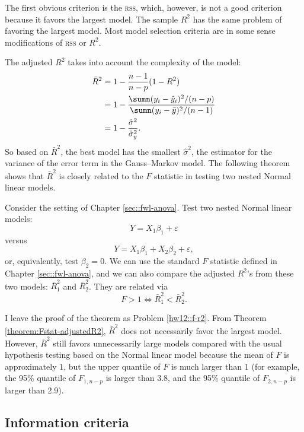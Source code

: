 The first obvious criterion is the \textsc{rss}, which, however, is not a good criterion because it favors the largest model. 
The sample $R^{2}$ has the same problem of favoring the largest model.
Most model selection criteria are in some sense modifications of \textsc{rss} or $R^2$.

 
The adjusted $R^{2}$ takes into account the complexity of the model:
\begin{align*}
\bar{R}^{2} & =1-\frac{n-1}{n-p}(1-R^{2})\\
 & =1-\frac{\sumn(y_{i}-\hat{y}_{i})^{2}/(n-p)}{\sumn(y_{i}-\bar{y})^{2}/(n-1)}\\
 & =1-\frac{\hat{\sigma}^{2}}{\hat{\sigma}_{y}^{2}}.
\end{align*}
So based on $\bar{R}^{2}$, the best model has the smallest $\hat{\sigma}^{2}$,
the estimator for the variance of the error term in the Gauss--Markov
model. The following theorem shows that $\bar{R}^{2}$ is closely related to the $F$ statistic in
testing two nested Normal linear models. 


\begin{theorem}
\label{theorem:Fstat-adjustedR2} 
Consider the setting of Chapter \ref{sec::fwl-anova}.
Test two nested Normal linear
models:
\[
Y=X_{1}\beta_{1}+\varepsilon
\]
versus
\[
Y=X_{1}\beta_{1}+X_{2}\beta_{2}+\varepsilon,
\]
or, equivalently, test $\beta_{2}=0$. We can use the standard
$F$ statistic defined in Chapter \ref{sec::fwl-anova}, and we can also compare the adjusted $R^{2}$'s from
these two models: $\bar{R}_{1}^{2}$ and $\bar{R}_{2}^{2}$. They
are related via
\[
F>1\Longleftrightarrow\bar{R}_{1}^{2}<\bar{R}_{2}^{2}.
\]
\end{theorem}


I leave the proof of the theorem as Problem \ref{hw12::f-r2}. 
From Theorem \ref{theorem:Fstat-adjustedR2}, $\bar{R}^{2}$ does not necessarily favor the largest model. However, $\bar{R}^{2}$ still
favors unnecessarily large models compared with the usual
hypothesis testing based on the Normal linear model because the mean of $F$ is approximately $1$, but the upper
quantile of $F$ is much larger than $1$ (for example, the 95\% quantile of $F_{1,n-p}$ is larger than 3.8, and the 95\% quantile of $F_{2,n-p}$ is larger than 2.9). 



\subsection{Information criteria}


